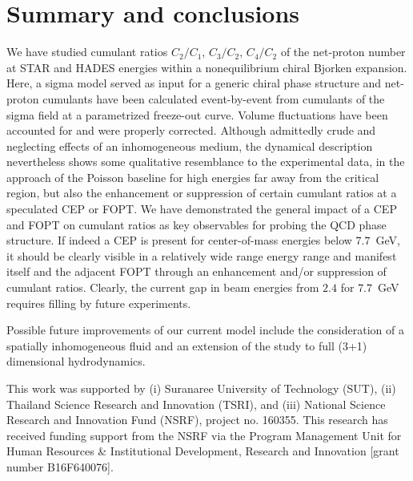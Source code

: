 \documentclass[%
 reprint,
 amsmath,amssymb,
 aps,
]{revtex4-2}
\begin{document}
\section{Summary and conclusions}
\label{sec:summary}
We have studied cumulant ratios $C_2/C_1$, $C_3/C_2$, $C_4/C_2$ of the net-proton number at STAR and HADES energies within a nonequilibrium chiral Bjorken expansion. Here, a sigma model served as input for a generic chiral phase structure and net-proton cumulants have been calculated event-by-event from cumulants of the sigma field at a parametrized freeze-out curve. Volume fluctuations have been accounted for and were properly corrected. Although admittedly crude and neglecting effects of an inhomogeneous medium, the dynamical description nevertheless shows some qualitative resemblance to the experimental data, in the approach of the Poisson baseline for high energies far away from the critical region, but also the enhancement or suppression of certain cumulant ratios at a speculated CEP or FOPT. We have demonstrated the general impact of a CEP and FOPT on cumulant ratios as key observables for probing the QCD phase structure. If indeed a CEP is present for center-of-mass energies below $7.7$~GeV, it should be clearly visible in a relatively wide range energy range and manifest itself and the adjacent FOPT through an enhancement and/or suppression of cumulant ratios. Clearly, the current gap in beam energies from $2.4$ for $7.7$~GeV requires filling by future experiments.

Possible future improvements of our current model include the consideration of a spatially inhomogeneous fluid and an extension of the study to full (3+1) dimensional hydrodynamics. 

\begin{acknowledgments}
This work was supported by (i) Suranaree University of Technology (SUT), (ii) Thailand Science Research and Innovation (TSRI), and (iii) National Science Research and Innovation Fund (NSRF), project no. 160355. This research has received funding support from the NSRF via the Program Management Unit for Human Resources \& Institutional Development, Research and Innovation [grant number B16F640076].
\end{acknowledgments}



\end{document}
